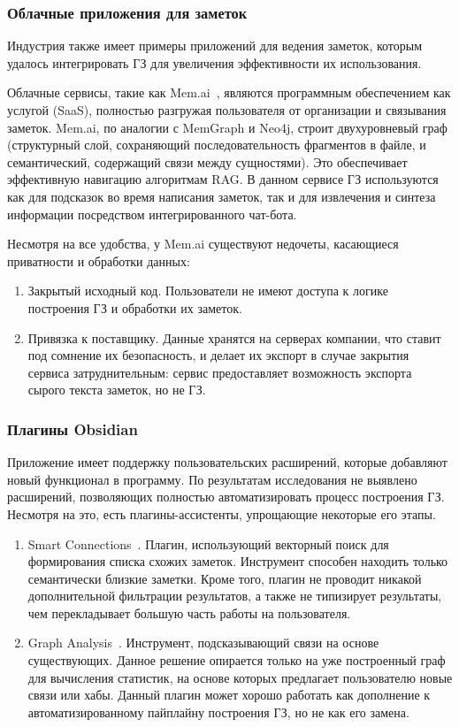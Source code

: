 \subsubsection*{Облачные приложения для заметок}
Индустрия также имеет примеры приложений для ведения заметок,
которым удалось интегрировать ГЗ для увеличения эффективности их использования.

Облачные сервисы, такие как Mem.ai~\cite{Mem_ai}, являются
программным обеспечением как услугой (SaaS), полностью разгружая пользователя
от организации и связывания заметок.
Mem.ai, по аналогии с MemGraph и Neo4j, строит двухуровневый граф
(структурный слой,
сохраняющий последовательность фрагментов в файле, и семантический,
содержащий связи между сущностями).
Это обеспечивает эффективную навигацию алгоритмам RAG.
В данном сервисе ГЗ используются как для подсказок во время написания заметок,
так и для извлечения и синтеза информации посредством интегрированного чат-бота.

Несмотря на все удобства, у Mem.ai существуют недочеты,
касающиеся приватности и обработки данных:
\begin{enumerate}
      \item Закрытый исходный код. Пользователи не имеют доступа к логике построения ГЗ
            и обработки их заметок.
      \item Привязка к поставщику. Данные хранятся на серверах компании,
            что ставит под сомнение их безопасность,
            и делает их экспорт в случае закрытия сервиса затруднительным:
            сервис предоставляет возможность экспорта сырого текста заметок,
            но не ГЗ.
\end{enumerate}

\subsubsection*{Плагины Obsidian}
Приложение имеет поддержку пользовательских расширений,
которые добавляют новый функционал в программу.
По результатам исследования не выявлено расширений,
позволяющих полностью автоматизировать процесс построения ГЗ.
Несмотря на это, есть плагины-ассистенты, упрощающие некоторые его этапы.

\begin{enumerate}
      \item Smart Connections~\cite{smart_connections}. Плагин, использующий векторный поиск для
            формирования списка схожих заметок.
            Инструмент способен находить только семантически близкие заметки.
            Кроме того, плагин не проводит никакой дополнительной фильтрации результатов,
            а также не типизирует результаты, чем перекладывает
            большую часть работы на пользователя.
      \item Graph Analysis~\cite{graph_analysis}. Инструмент, подсказывающий связи на основе существующих.
            Данное решение опирается только на уже построенный граф для вычисления статистик,
            на основе которых предлагает пользователю новые связи или хабы.
            Данный плагин может хорошо работать
            как дополнение к автоматизированному пайплайну построения ГЗ,
            но не как его замена.
\end{enumerate}

